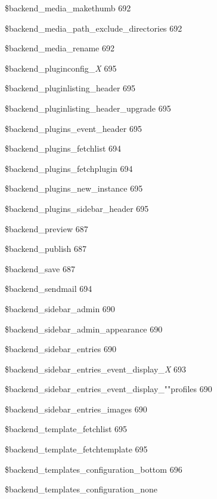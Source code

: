 \documentclass{book}
\renewcommand\subsubitem{\par\hspace*{3mm}}
\begin{document}
\begin{multicols}{2}
\begin{osp-index}
      \subsubitem \$backend\_media\_makethumb\hspace{1mm} 692
      \subsubitem \$backend\_media\_path\_exclude\_directories\hspace{1mm} 
		692
      \subsubitem \$backend\_media\_rename\hspace{1mm} 692
      \subsubitem \$backend\_pluginconfig\_\textsl  {X}\hspace{1mm} 695
      \subsubitem \$backend\_pluginlisting\_header\hspace{1mm} 695
      \subsubitem \$backend\_pluginlisting\_header\_upgrade\hspace{1mm} 
		695
      \subsubitem \$backend\_plugins\_event\_header\hspace{1mm} 695
      \subsubitem \$backend\_plugins\_fetchlist\hspace{1mm} 694
      \subsubitem \$backend\_plugins\_fetchplugin\hspace{1mm} 694
      \subsubitem \$backend\_plugins\_new\_instance\hspace{1mm} 695
      \subsubitem \$backend\_plugins\_sidebar\_header\hspace{1mm} 695
      \subsubitem \$backend\_preview\hspace{1mm} 687
      \subsubitem \$backend\_publish\hspace{1mm} 687
      \subsubitem \$backend\_save\hspace{1mm} 687
      \subsubitem \$backend\_sendmail\hspace{1mm} 694
      \subsubitem \$backend\_sidebar\_admin\hspace{1mm} 690
      \subsubitem \$backend\_sidebar\_admin\_appearance\hspace{1mm} 690
      \subsubitem \$backend\_sidebar\_entries\hspace{1mm} 690
      \subsubitem \$backend\_sidebar\_entries\_event\_display\_\textsl  {X}\hspace{1mm} 
		693
      \subsubitem \$backend\_sidebar\_entries\_event\_display\_""profiles\hspace{1mm} 
		690
      \subsubitem \$backend\_sidebar\_entries\_images\hspace{1mm} 690
      \subsubitem \$backend\_template\_fetchlist\hspace{1mm} 695
      \subsubitem \$backend\_template\_fetchtemplate\hspace{1mm} 695
      \subsubitem \$backend\_templates\_configuration\_bottom\hspace{1mm} 
		696
      \subsubitem \$backend\_templates\_configuration\_none\hspace{1mm} 

\end{osp-index}
\end{multicols}
\end{document}
